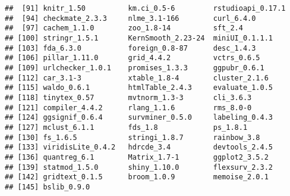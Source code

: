 \documentclass[
]{article}
\begin{document}
\begin{verbatim}
##  [91] knitr_1.50          km.ci_0.5-6         rstudioapi_0.17.1  
##  [94] checkmate_2.3.3     nlme_3.1-166        curl_6.4.0         
##  [97] cachem_1.1.0        zoo_1.8-14          sft_2.4            
## [100] stringr_1.5.1       KernSmooth_2.23-24  miniUI_0.1.1.1     
## [103] fda_6.3.0           foreign_0.8-87      desc_1.4.3         
## [106] pillar_1.11.0       grid_4.4.2          vctrs_0.6.5        
## [109] urlchecker_1.0.1    promises_1.3.3      ggpubr_0.6.1       
## [112] car_3.1-3           xtable_1.8-4        cluster_2.1.6      
## [115] waldo_0.6.1         htmlTable_2.4.3     evaluate_1.0.5     
## [118] tinytex_0.57        mvtnorm_1.3-3       cli_3.6.3          
## [121] compiler_4.4.2      rlang_1.1.6         rms_8.0-0          
## [124] ggsignif_0.6.4      survminer_0.5.0     labeling_0.4.3     
## [127] mclust_6.1.1        fds_1.8             ps_1.8.1           
## [130] fs_1.6.5            stringi_1.8.7       rainbow_3.8        
## [133] viridisLite_0.4.2   hdrcde_3.4          devtools_2.4.5     
## [136] quantreg_6.1        Matrix_1.7-1        ggplot2_3.5.2      
## [139] statmod_1.5.0       shiny_1.10.0        flexsurv_2.3.2     
## [142] gridtext_0.1.5      broom_1.0.9         memoise_2.0.1      
## [145] bslib_0.9.0
\end{verbatim}
\end{document}
